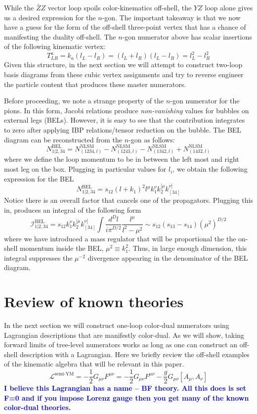 \documentclass[11pt,letter]{article}
\newcommand{\draftnoteJM}[1]{\textbf{\textcolor{blue}{#1}}}
\def\be{\begin{equation}}
\def\ee{\end{equation}}
\begin{document}
While the $\bar{Z}Z$ vector loop spoils color-kinematics off-shell, the $Y\!Z$ loop alone gives us a desired expression for the $n$-gon. The important takeaway is that we now have a guess for the form of the off-shell three-point vertex that has a chance of manifesting the duality off-shell. The $n$-gon numerator above has scalar insertions of the following kinematic vertex:
\be
T^{a}_{LR} = k_a(l_L-l_{R}) = (l_L+l_{R}) (l_L-l_{R})  = l_L^2-l_{R}^2 
\ee
Given this structure, in the next section we will attempt to construct two-loop basis diagrams from these cubic vertex assignments and try to reverse engineer the particle content that produces these master numerators.

Before proceeding, we note a strange property of the $n$-gon numerator for the pions. In this form, Jacobi relations produce \textit{non-vanishing} values for bubbles on external legs (BELs). However, it is easy to see that the contribution integrates to zero after applying IBP relations/tensor reduction on the bubble. The BEL diagram can be reconstructed from the $n$-gon as follows:
\be
N^{\text{BEL}}_{1|2,34} = N^{\text{NLSM}}_{(1234,l)}-N^{\text{NLSM}}_{(1243,l)}-N^{\text{NLSM}}_{(1342,l)}+N^{\text{NLSM}}_{(1432,l)}
\ee
where we define the loop momentum to be in between the left most and right most leg on the box. Plugging in particular values for $l_i$, we obtain the following expression for the BEL
\be
N^{\text{BEL}}_{1|2,34} = s_{12} (l+k_1)^2 l^{\mu} k_1^{\nu} k_2^{[\mu} k_{[34]}^{\nu]} 
\ee
Notice there is an overall factor that cancels one of the propagators. Plugging this in, produces an integral of the following form
\be
\mathcal{I}^{\text{BEL}}_{1|2,34} = s_{12} k_1^{\nu} k_2^{[\mu} k_{[34]}^{\nu]} \int \frac{d^D l}{i\pi^{D/2}} \frac{l^\mu }{l^2-\mu^2} \sim   s_{12}(s_{13}-s_{14}) (\mu^2)^{D/2}
\ee
where we have introduced a mass regulator that will be proportional the the on-shell momentum inside the BEL, $\mu^2 \equiv k_1^2$. Thus, in large enough dimension, this integral suppresses the $\mu^{-2}$ divergence appearing in the denominator of the BEL diagram. 


\section{Review of known theories}
\label{sec:CKLagrangians}
In the next section we will construct one-loop color-dual numerators using Lagrangian descriptions that are manifestly color-dual. As we will show, taking forward limits of tree-level numerators works as long as one can construct an off-shell description with a Lagrangian. Here we briefly review the off-shell examples of the kinematic algebra that will be relevant in this paper. 
\be
\mathcal{L}^{\text{semi-YM}} = - \frac{1}{2} G_{\mu\nu} F^{\mu\nu} = - \frac{1}{2} G_{\mu\nu} F^{\mu\nu} - \frac{g}{2} G_{\mu\nu} [A_\mu, A_\nu]
\ee
\draftnoteJM{I believe this Lagrangian has a name -- BF theory.  All this does is set F=0 and if you impose Lorenz gauge then you get many of the known color-dual theories.}
\end{document}

